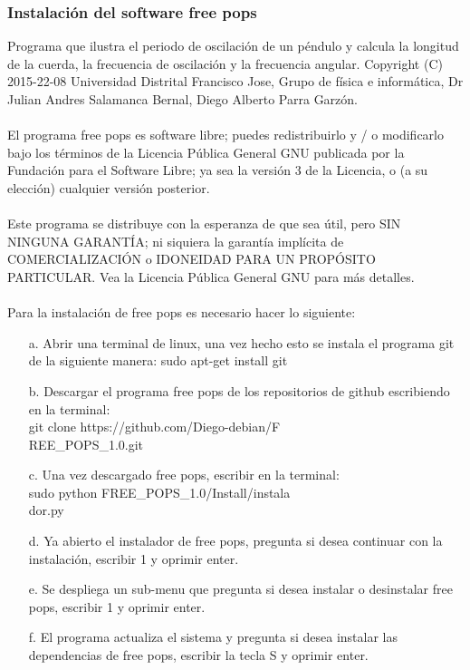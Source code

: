 \documentclass[12pt]{article}
\begin{document}
\begin{multicols}{2}
\subsubsection{Instalación del software free pops}
Programa que  ilustra el periodo de oscilación de un péndulo  y calcula la longitud de la cuerda, la frecuencia de oscilación y la frecuencia angular.   Copyright (C) 2015-22-08  Universidad Distrital Francisco Jose, Grupo de física e informática, Dr Julian Andres Salamanca Bernal, Diego Alberto Parra Garzón.
\\ \\ 
El programa free pops es software libre; puedes redistribuirlo y / o modificarlo bajo los términos de la Licencia Pública General GNU publicada por la Fundación para el Software Libre; ya sea la versión 3 de la Licencia, o (a su elección) cualquier versión posterior. 
\\ \\ 
Este programa se distribuye con la esperanza de que sea útil, pero SIN NINGUNA GARANTÍA; ni siquiera la garantía implícita de COMERCIALIZACIÓN o IDONEIDAD PARA UN PROPÓSITO PARTICULAR. Vea la Licencia Pública General GNU para más detalles. 
\\ \\
Para la instalación de free pops es necesario hacer lo siguiente:
\begin{enumerate}
\item[a. ] Abrir una terminal de linux, una vez hecho esto se instala el programa git de la siguiente manera: sudo apt-get install git 
\item[b. ] Descargar el programa free pops de los repositorios de github escribiendo en la terminal: \\git clone https://github.com/Diego-debian/F\\REE\_POPS\_1.0.git 
\item[c. ] Una vez descargado free pops, escribir en la terminal:\\sudo python FREE\_POPS\_1.0/Install/instala\\dor.py 
\item[d. ] Ya abierto el instalador de free pops, pregunta si desea continuar con la instalación, escribir 1 y oprimir enter.
\item[e. ] Se despliega un sub-menu que pregunta si desea instalar o desinstalar free pops, escribir 1 y oprimir enter.
\item[f. ] El programa actualiza el sistema y pregunta si desea instalar las dependencias de free pops, escribir la tecla S y oprimir enter. 

\end{enumerate}
\end{multicols}
\end{document}
